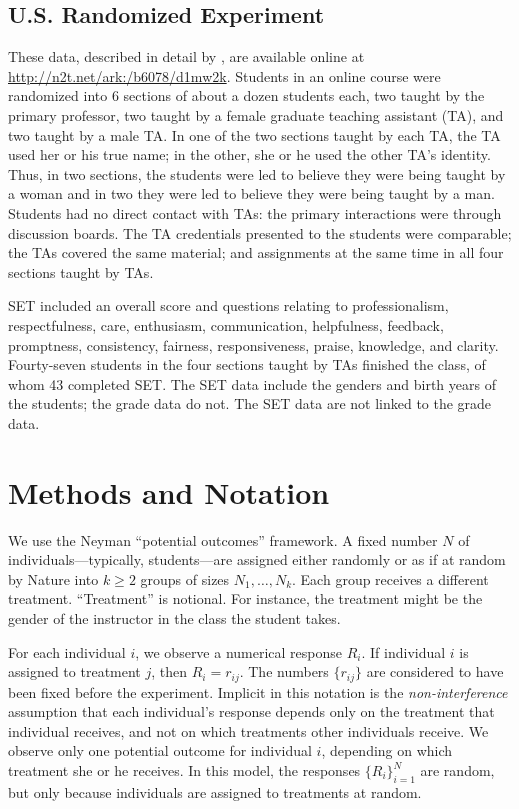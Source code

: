 \documentclass[12pt]{article}
\begin{document}
\subsection{U.S. Randomized Experiment}
These data, described in detail by \cite{MacNell2014}, are available online at 
\url{http://n2t.net/ark:/b6078/d1mw2k}.
Students in an online course were randomized into 6 sections of about a dozen students each, 
two taught by the primary professor,
two taught by a female graduate teaching assistant (TA), and two taught by a male TA.
In one of the two sections taught by each TA, the TA used her or his
true name; in the other, she or he used the other TA's identity.
Thus, in two sections, the students were led to believe they were being taught by a woman
and in two they were led to believe they were being taught by a man.
Students had no direct contact with TAs: the primary interactions were through
discussion boards.
The TA credentials presented to the students were comparable; the TAs covered
the same material; and assignments at the same time in all four sections taught by TAs.

SET included an overall score and questions relating to
professionalism, respectfulness, care, enthusiasm, communication, helpfulness,
feedback, promptness, consistency, fairness, responsiveness, praise, knowledge, 
and clarity.
Fourty-seven students in the four sections taught by TAs finished the class,
of whom 43 completed SET.
The SET data include the genders and birth years of the students; the grade data do not.
The SET data are not linked to the grade data.

\section{Methods and Notation} \label{sec:methods}

We use the Neyman ``potential outcomes'' framework.
A fixed number $N$ of individuals---typically, students---are assigned either
randomly or as if at random by Nature into 
$k \ge 2$ groups of sizes $N_1, \ldots, N_k$.
Each group receives a different treatment.
``Treatment'' is notional. 
For instance, the treatment might be the gender of the
instructor in the class the student takes.

For each individual $i$, we observe a numerical response $R_i$.
If individual $i$ is assigned to treatment $j$, then $R_i = r_{ij}$.
The numbers $\{r_{ij}\}$ are considered to have been fixed before the experiment.
Implicit in this notation is the \emph{non-interference} assumption that
each individual's response depends only on the treatment that individual receives, 
and not on which treatments other individuals receive.
We observe only one potential outcome for individual $i$, 
depending on which treatment she or he receives.
In this model, the responses $\{R_i\}_{i=1}^N$ are random, but only because individuals are 
assigned to treatments at random.
\end{document}
